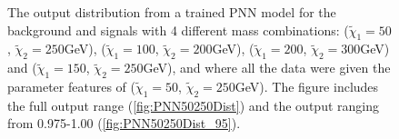 \begin{figure}
    \caption{The output distribution from a trained \ac{PNN} model for the background and signals with 4 different mass combinations:
    ($\tilde{\chi}_1=50$, $\tilde{\chi}_2=250$GeV), ($\tilde{\chi}_1=100$, $\tilde{\chi}_2=200$GeV), 
    ($\tilde{\chi}_1=200$, $\tilde{\chi}_2=300$GeV) and ($\tilde{\chi}_1=150$, $\tilde{\chi}_2=250$GeV), and where all the data were given the 
    parameter features of ($\tilde{\chi}_1=50$, $\tilde{\chi}_2=250$GeV). The figure includes the full output range (\ref{fig:PNN50250Dist}) 
    and the output ranging from 0.975-1.00 (\ref{fig:PNN50250Dist_95}).}
    \label{fig:PNN50250}
\end{figure}
